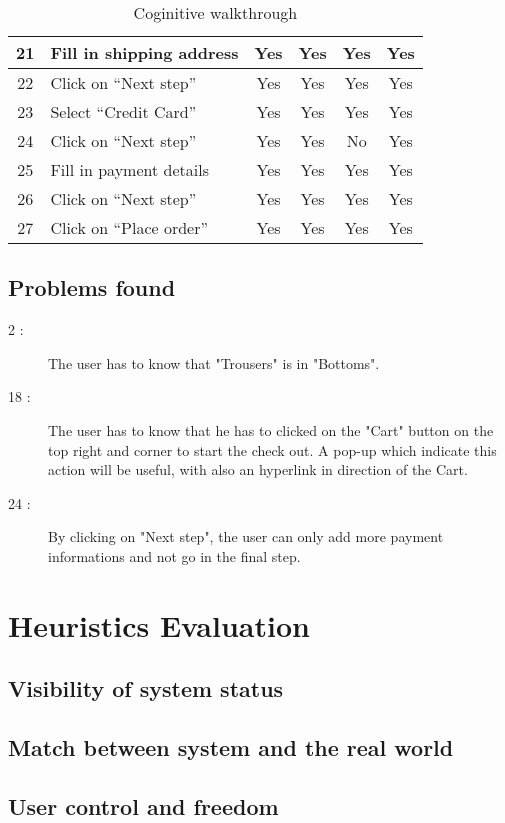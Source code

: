 \documentclass[fontsize=12pt,paper=a4]{scrartcl}
\begin{document}
\begin{table}[htdp]
\begin{center}
\begin{tabular}{|c|l|c|c|c|c|}
\hline
21 & Fill in shipping address & Yes & Yes & Yes & Yes\\
\hline
22 & Click on ``Next step'' & Yes & Yes & Yes & Yes\\
\hline
23 & Select ``Credit Card'' & Yes & Yes & Yes & Yes\\
\hline
24 & Click on ``Next step'' & Yes & Yes & No & Yes\\
\hline
25 & Fill in payment details & Yes & Yes & Yes & Yes\\
\hline
26 & Click on ``Next step'' & Yes & Yes & Yes & Yes\\
\hline
27 & Click on ``Place order'' & Yes & Yes & Yes & Yes\\
\hline
\end{tabular}
\end{center}
\label{Coginitive_walkthrough}
\caption{Coginitive walkthrough}
\end{table}%

\subsection{Problems found}
\begin{description}
\item[2 :] The user has to know that "Trousers" is in "Bottoms". 
\item[18 :] The user has to know that he has to clicked on the "Cart" button on the top right and corner to start the check out. A pop-up which indicate this action will be useful, with also an hyperlink in direction of the Cart.
\item[24 :] By clicking on "Next step", the user can only add more payment informations and not go in the final step.
\end{description}

\section{Heuristics Evaluation}

\subsection{Visibility of system status}

\subsection{Match between system and the real world}

\subsection{User control and freedom}
\end{document}
